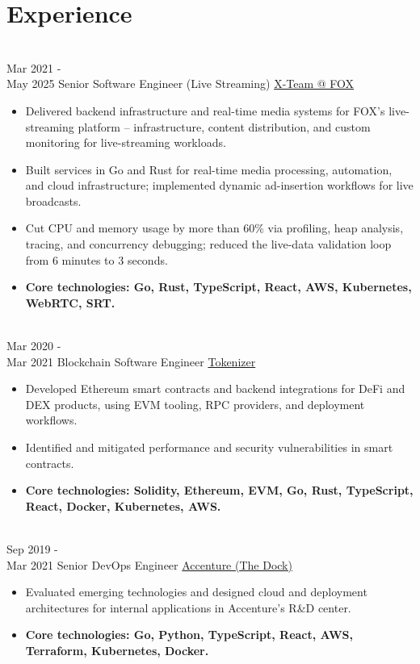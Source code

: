 \documentclass[letterpaper]{twentysecondcv}
\begin{document}
\makeprofilePart
\enlargethispage{3\baselineskip}
\section{Experience}
\begin{twenty}

\twentyitem
    {\\
    Mar 2021 - \\ May 2025}
    {Senior Software Engineer (Live Streaming)}
    {\href{https://x-team.com/}{X-Team @ FOX}}
    {}
    {
    \begin{itemize}
    \item Delivered backend infrastructure and real-time media systems for FOX's live-streaming platform -- infrastructure, content distribution, and custom monitoring for live-streaming workloads.
    \item Built services in Go and Rust for real-time media processing, automation, and cloud infrastructure; implemented dynamic ad-insertion workflows for live broadcasts.
    \item Cut CPU and memory usage by more than 60\% via profiling, heap analysis, tracing, and concurrency debugging; reduced the live-data validation loop from 6 minutes to 3 seconds.
    \item \textbf{Core technologies: Go, Rust, TypeScript, React, AWS, Kubernetes, WebRTC, SRT.}
    \end{itemize}
    }

\twentyitem
    {\\
    Mar 2020 - \\ Mar 2021}
    {Blockchain Software Engineer}
    {\href{https://tokenizer.cc}{Tokenizer}}
    {}
    {
    \begin{itemize}
    \item Developed Ethereum smart contracts and backend integrations for DeFi and DEX products, using EVM tooling, RPC providers, and deployment workflows.
    \item Identified and mitigated performance and security vulnerabilities in smart contracts.
    \item \textbf{Core technologies: Solidity, Ethereum, EVM, Go, Rust, TypeScript, React, Docker, Kubernetes, AWS.}
    \end{itemize}
    }

\twentyitem
    {\\
    Sep 2019 - \\ Mar 2021}
    {Senior DevOps Engineer}
    {\href{https://www.accenture.com/ie-en}{Accenture (The Dock)}}
    {}
    {
    \begin{itemize}
    \item Evaluated emerging technologies and designed cloud and deployment architectures for internal applications in Accenture's R\&D center.
    \item \textbf{Core technologies: Go, Python, TypeScript, React, AWS, Terraform, Kubernetes, Docker.}
    \end{itemize}
    }

\end{twenty}
\end{document}
